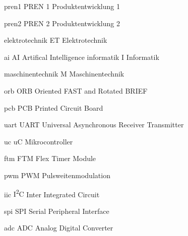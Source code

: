 \newacronym
  {pren1}                 %
  {PREN 1}                %
  {Produktentwicklung 1}  %

\newacronym
  {pren2}                 %
  {PREN 2}                %
  {Produktentwicklung 2}  %

\newacronym
  {elektrotechnik}                    %
  {ET}                    %
  {Elektrotechnik}        %

\newacronym
  {ai}                    %
  {AI}                    %
  {Artifical Intelligence}        %
\newacronym
  {informatik}             %
  {I}                      %
  {Informatik}             %

\newacronym
  {maschinentechnik}       %
  {M}                      %
  {Maschinentechnik}       %

\newacronym
  {orb}                                    %
  {ORB}                                    %
  {Oriented FAST and Rotated BRIEF}        %

\newacronym
  {pcb}                         %
  {PCB}                         %
  {Printed Circuit Board}       %

\newacronym
  {uart}       %
  {UART}                      %
  {Universal Asynchronous Receiver Transmitter}       %

\newacronym
  {uc}       %
  {uC}                      %
  {Mikrocontroller}       %

\newacronym
  {ftm}       %
  {FTM}                      %
  {Flex Timer Module}       %

\newacronym
  {pwm}                 %
  {PWM}                %
  {Pulsweitenmodulation}  %

\newacronym
  {iic}                 %
  {I\textsuperscript{2}C}     %
  {Inter Integrated Circuit}  %


\newacronym
  {spi}                 %
  {SPI}                %
  {Serial Peripheral Interface}  %

\newacronym
  {adc}                 %
  {ADC}                %
  {Analog Digital Converter}  %

